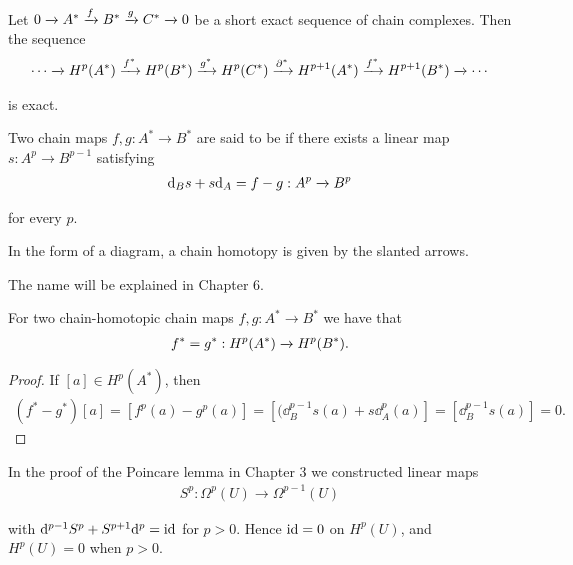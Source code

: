 \begin{theorem}\label{theorem:4-9}
Let $0\xrightarrow[]{}A^*\xrightarrow[]{f}B^*\xrightarrow[]{g}C^*\xrightarrow[]{}0$ be a short exact sequence of chain complexes. Then the sequence
\begin{align*}
  \cdots\xrightarrow[]{}H^p(A^*)\xrightarrow[]{f^*}H^p(B^*)\xrightarrow[]{g^*}H^p(C^*)\xrightarrow[]{\partial^*}H^{p+1}(A^*)\xrightarrow[]{f^*}H^{p+1}(B^*)\xrightarrow[]{} \cdots
\end{align*}

is exact.
\end{theorem}


\begin{definition}\label{def:4-10}
  Two chain maps $f, g:A^*\to B^*$ are said to be  if there exists a linear map
$s:A^p\to B^{p-1}$ satisfying
\begin{align*}
  \mathrm{d}_{B}s + s\mathrm{d}_A = f - g: A^p\xrightarrow[]{}B^p
\end{align*}

for every $p$.
\end{definition}

In the form of a diagram, a chain homotopy is given by the slanted arrows.
\begin{center}
\end{center}


The name  will be explained in Chapter 6.


\begin{lemma}\label{lemma:4-11}
  For two chain-homotopic chain maps $f,g:A^*\to B^*$ we have that
  \begin{align*}
    f^* = g^*: H^p(A^*)\xrightarrow[]{}H^p(B^*).
  \end{align*}
\end{lemma}

\begin{proof}
  If $[a]\in H^p(A^*)$, then 
  \begin{align*}
    (f^* - g^*)[a] = [f^p(a) - g^p(a)] = [(\dd_B^{p-1}s(a) + s\dd^p_A(a)] 
    = [\dd^{p-1}_Bs(a)] 
    = 0.
  \end{align*}
\end{proof}


\begin{remark}\label{remark:4-12}
  In the proof of the Poincare lemma in Chapter 3 we constructed
linear maps
\begin{align*}
  S^p: \Omega^p(U)\to\Omega^{p-1}(U)
\end{align*}

with $\mathrm{d}^{p-1}S^p + S^{p+1}\mathrm{d}^p = \operatorname{id}$ for $p>0$. Hence $\operatorname{id}=0$ on $H^p(U)$, and $H^p(U) = 0$
when $p>0$.
\end{remark}

